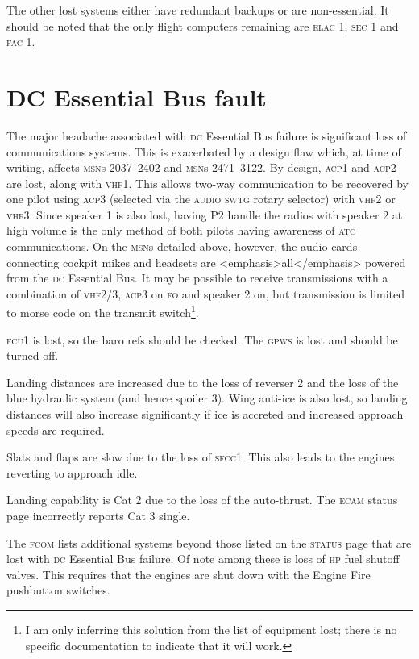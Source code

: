 \documentclass[a5paper,11pt,twoside]{book}
\newcommand{\ac}[1]{{\scshape\MakeLowercase{#1}}}
\newcommand{\inlcite}[1]{{\ac{#1}}}
\newcommand{\multicite}[1]{%
  \nopagebreak
  \noindent{{\color{blue}\footnotesize[ \inlcite{#1} ]}}
}
\begin{document}
The other lost systems either have redundant backups or are non-essential. It
should be noted that the only flight computers remaining are \ac{ELAC} 1, \ac{SEC} 1 and
\ac{FAC} 1.

\multicite{\uline{ELEC}~DC~BUS~2~FAULT, FCOM~PRO.AEP.ELEC}


\section{DC Essential Bus fault}

The major headache associated with \ac{DC} Essential Bus failure is significant loss
of communications systems. This is exacerbated by a design flaw which, at time
of writing, affects \ac{MSN}s 2037–2402 and \ac{MSN}s 2471–3122. By design, \ac{ACP}1 and \ac{ACP}2
are lost, along with \ac{VHF}1. This allows two-way communication to be recovered by
one pilot using \ac{ACP}3 (selected via the \ac{AUDIO} \ac{SWTG} rotary selector) with \ac{VHF}2 or
\ac{VHF}3. Since speaker 1 is also lost, having P2 handle the radios with speaker 2
at high volume is the only method of both pilots having awareness of \ac{ATC}
communications. On the \ac{MSN}s detailed above, however, the audio cards connecting
cockpit mikes and headsets are <emphasis>all</emphasis> powered from the \ac{DC}
Essential Bus. It may be possible to receive transmissions with a combination of
\ac{VHF}2/3, \ac{ACP}3 on \ac{FO} and speaker 2 on, but transmission is limited to morse code
on the transmit switch\footnote{I am only inferring this solution from the list
of equipment lost; there is no specific documentation to indicate that it will
work.}.

\ac{FCU}1 is lost, so the baro refs should be checked. The \ac{GPWS} is lost and should be
turned off.

Landing distances are increased due to the loss of reverser 2 and the loss of
the blue hydraulic system (and hence spoiler 3). Wing anti-ice is also lost, so
landing distances will also increase significantly if ice is accreted and
increased approach speeds are required.

Slats and flaps are slow due to the loss of \ac{SFCC}1. This also leads to the
engines reverting to approach idle.

Landing capability is Cat 2 due to the loss of the auto-thrust. The \ac{ECAM} status
page incorrectly reports Cat 3 single.

The \ac{FCOM} lists additional systems beyond those listed on the \ac{STATUS} page that
are lost with \ac{DC} Essential Bus failure. Of note among these is loss of \ac{HP} fuel
shutoff valves. This requires that the engines are shut down with the Engine
Fire pushbutton switches.
\end{document}
